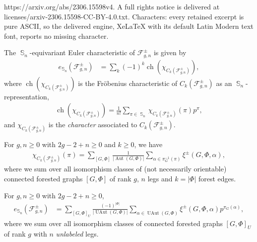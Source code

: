 \documentclass[10pt,a4paper]{amsart}
\DeclareMathOperator{\SG}{{\mathbb S}}
\newcommand{\Aut}{{\operatorname{Aut}}}
\newcommand{\F}{\mathcal{F}}
\newcommand{\UAut}{{\operatorname{UAut}}}
\newcommand{\ch}{\operatorname{ch}}
\begin{document}
https://arxiv.org/abs/2306.15598v4. A full rights notice is delivered at licenses/arxiv-2306.15598-CC-BY-4.0.txt. Characters: every retained excerpt is pure ASCII, so the delivered engine, XeLaTeX with its default Latin Modern text font, reports no missing character.
\begin{proposition}
\label{prop:equivC}
The $\SG_n$-equivariant Euler characteristic of $\F_{g,n}^\pm$ is given by 
\begin{align*} e_{\SG_n}(\F_{g,n}^\pm) &= \sum_k (-1)^k \ch(\chi_{C_k(\F^\pm_{g,n})}), \end{align*}
where $\ch(\chi_{C_k(\F^\pm_{g,n})})$
is the Fr\"obenius characteristic of $C_k(\F^\pm_{g,n})$ as an $\SG_n$-representation,
\begin{align*} \ch(\chi_{C_k(\F^\pm_{g,n})}) = \frac{1}{n!} \sum_{\pi \in \SG_n} \chi_{C_k(\F^\pm_{g,n})}(\pi) p^\pi, \end{align*}
and $\chi_{C_k(\F^\pm_{g,n})}$ 
is the \emph{character} associated to $C_k(\F^\pm_{g,n})$.
\end{proposition}

\begin{corollary}
\label{cor:chain_trace}
For $g,n \geq 0$ with $2g - 2 + n \geq 0$ and $k \geq 0$, we have %
\begin{align*} \chi_{C_k(\F^{\pm}_{g,n})}(\pi) = \sum_{[G,\Phi]} \frac{1}{|\Aut(G,\Phi)|} \sum_{\alpha \in \pi_G^{-1}(\pi)} \xi^\pm(G,\Phi,\alpha), \end{align*}
where we sum over all isomorphism classes of (not necessarily orientable) connected forested graphs $[G,\Phi]$ of rank $g$, $n$ legs and $k=|\Phi|$ forest edges.
\end{corollary}

\begin{theorem}
For $g,n \geq 0$ with $2g - 2 + n \geq 0$, %
%
%
%
%
\label{thm:equiv}
\begin{align*} e_{\SG_n}(\F^\pm_{g,n}) &= \sum_{[G,\Phi]_U} \frac{(-1)^{|\Phi|}}{|\UAut(G,\Phi)|} \sum_{\alpha \in \UAut(G,\Phi)} \xi^\pm(G,\Phi,\alpha) p^{\pi_G(\alpha)}, \end{align*}
where we sum over all isomorphism classes of connected forested graphs $[G,\Phi]_U$ of rank $g$ with $n$ \emph{unlabeled} legs.

\end{theorem}
\end{document}
